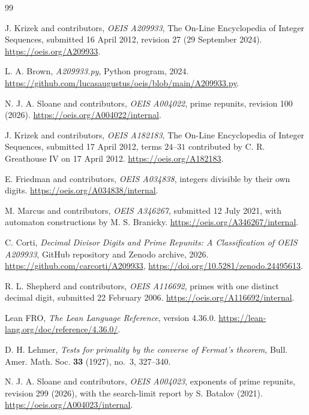 \documentclass[11pt]{article}
\begin{document}
\clearpage
\begin{thebibliography}{99}
\raggedright\sloppy

J. Krizek and contributors, \emph{OEIS A209933}, The On-Line
Encyclopedia of Integer Sequences, submitted 16 April 2012, revision 27
(29 September 2024). \url{https://oeis.org/A209933}.

L. A. Brown, \emph{A209933.py}, Python program, 2024.
\url{https://github.com/lucasaugustus/oeis/blob/main/A209933.py}.

N. J. A. Sloane and contributors, \emph{OEIS A004022}, prime repunits,
revision 100 (2026). \url{https://oeis.org/A004022/internal}.

J. Krizek and contributors, \emph{OEIS A182183}, The On-Line
Encyclopedia of Integer Sequences, submitted 17 April 2012, terms
\(24\)--\(31\) contributed by C. R. Greathouse IV on 17 April 2012.
\url{https://oeis.org/A182183}.

E. Friedman and contributors, \emph{OEIS A034838}, integers divisible
by their own digits. \url{https://oeis.org/A034838/internal}.

M. Marcus and contributors, \emph{OEIS A346267}, submitted 12 July
2021, with automaton constructions by M. S. Branicky.
\url{https://oeis.org/A346267/internal}.

C. Corti, \emph{Decimal Divisor Digits and Prime Repunits: A
Classification of OEIS A209933}, GitHub repository and Zenodo archive,
2026. \url{https://github.com/carcorti/A209933},
\url{https://doi.org/10.5281/zenodo.24495613}.

R. L. Shepherd and contributors, \emph{OEIS A116692}, primes with
one distinct decimal digit, submitted 22 February 2006.
\url{https://oeis.org/A116692/internal}.

Lean FRO, \emph{The Lean Language Reference}, version 4.36.0.
\url{https://lean-lang.org/doc/reference/4.36.0/}.

D. H. Lehmer, \emph{Tests for primality by the converse of Fermat's
theorem}, Bull. Amer. Math. Soc. \textbf{33} (1927), no.~3, 327--340.

N. J. A. Sloane and contributors, \emph{OEIS A004023}, exponents of
prime repunits, revision 299 (2026), with the search-limit report
by S. Batalov (2021). \url{https://oeis.org/A004023/internal}.


\end{thebibliography}
\end{document}
